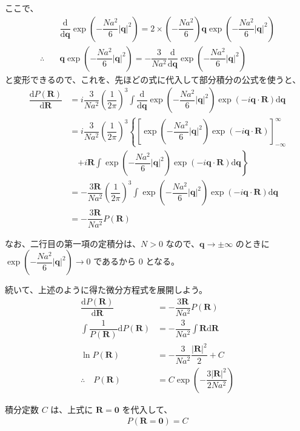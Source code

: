 \documentclass[uplatex,dvipdfmx,a4paper,11pt]{jsarticle}
\newcommand{\diff}{\mathrm d}
\begin{document}
\begin{enumerate}
ここで、
\begin{align*}
&\dfrac{ \diff}{\diff \bm{q}} \exp \left( - \dfrac{Na^2}{6} |\bm{q}|^2 \right) = 2\times \left( -\dfrac{Na^2}{6} \right)  \bm{q} \exp \left(- \dfrac{Na^2}{6} |\bm{q}|^2 \right) \\
\therefore \quad &\bm{q} \exp \left( - \dfrac{Na^2}{6} |\bm{q}|^2 \right) = - \dfrac{3}{Na^2} \dfrac{ \diff}{\diff \bm{q}} \exp \left( - \dfrac{Na^2}{6} |\bm{q}|^2 \right) 
\end{align*}
と変形できるので、これを、先ほどの式に代入して部分積分の公式を使うと、
\begin{align*}
\dfrac{ \diff P(\bm{R})}{\diff \bm{R}} 
	&= i \dfrac{3}{Na^2} \left( \dfrac{1}{2 \pi} \right)^3 \int \dfrac{ \diff}{\diff \bm{q}} \exp \left( - \dfrac{Na^2}{6} |\bm{q}|^2 \right) \exp \left( -i \bm{q} \cdot \bm{R} \right) \diff \bm{q}\\
	&= i \dfrac{3}{Na^2} \left( \dfrac{1}{2 \pi} \right)^3 \left\{ \left[\exp \left( - \dfrac{Na^2}{6} |\bm{q}|^2 \right) \exp \left( -i \bm{q} \cdot \bm{R} \right) \right]_{-\infty}^{\infty} \right. \\
	&\quad \left. + i \bm{R} \int \exp \left( - \dfrac{Na^2}{6} |\bm{q}|^2 \right) \exp \left( -i \bm{q} \cdot \bm{R} \right) \diff \bm{q} \right\} \\
	&= - \dfrac{3 \bm{R} }{Na^2} \left( \dfrac{1}{2 \pi} \right)^3 \int \exp \left( - \dfrac{Na^2}{6} |\bm{q}|^2 \right) \exp \left( -i \bm{q} \cdot \bm{R} \right) \diff \bm{q} \\
	&= - \dfrac{3 \bm{R} }{Na^2} P(\bm{R})
\end{align*}

なお、二行目の第一項の定積分は、$N>0$ なので、$\bm{q} \rightarrow \pm \infty$ のときに $\exp \left(- \dfrac{Na^2}{6} |\bm{q}|^2 \right) \rightarrow 0 $ であるから $0$ となる。

続いて、上述のように得た微分方程式を展開しよう。
\begin{align*}
\dfrac{ \diff P(\bm{R})}{\diff \bm{R}} &= - \dfrac{3 \bm{R} }{Na^2} P(\bm{R}) \\
\int \dfrac{1}{P(\bm{R})} \diff P(\bm{R}) &= - \dfrac{3}{Na^2} \int \bm{R} \diff \bm{R} \\
\ln P(\bm{R}) &= - \dfrac{3}{Na^2} \dfrac{|\bm{R}|^2}{2} + C \\
\therefore \quad P(\bm{R}) &= C \exp \left( - \dfrac{3|\bm{R}|^2}{2 Na^2} \right)
\end{align*}

積分定数 $C$ は、上式に $\bm{R}=\bm{0}$ を代入して、
\begin{align*}
P(\bm{R}=\bm{0}) = C
\end{align*}


\end{enumerate}
\end{document}
